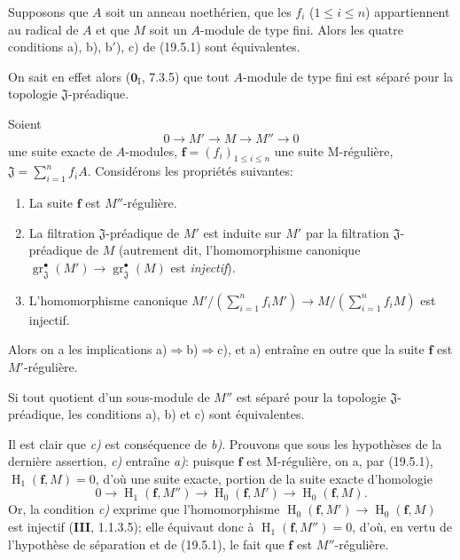 \begin{corollary}[19.5.2]
\label{IV.19.5.2}
Supposons que $A$ soit un anneau noethérien, que les $f_i$ \textup{($1\leq i\leq n$)} appartiennent au radical de $A$ et que $M$ soit un $A$-module de type fini. Alors les quatre conditions \textup{a), b), b$'$), c)} de \textup{(19.5.1)} sont équivalentes.
\end{corollary}

On sait en effet alors ($\mathbf{0}_{\mathrm I}$, 7.3.5) que tout $A$-module de type fini est séparé pour la topologie $\mathfrak J$-préadique.

\begin{proposition}[19.5.3]
\label{IV.19.5.3}
Soient
\[
  0\longrightarrow M'\longrightarrow M\longrightarrow M''\longrightarrow0
\]
une suite exacte de $A$-modules, $\mathbf f=(f_i)_{1\leq i\leq n}$ une suite M-régulière, $\mathfrak J=\sum_{i=1}^n f_iA$. Considérons les propriétés suivantes:
\begin{enumerate}
  \item[\textup{a)}] La suite $\mathbf f$ est $M''$-régulière.
  \item[\textup{b)}] La filtration $\mathfrak J$-préadique de $M'$ est induite sur $M'$ par la filtration $\mathfrak J$-préadique de $M$ \textup{(autrement dit, l'homomorphisme canonique $\operatorname{gr}_{\mathfrak J}^\bullet(M')\to\operatorname{gr}_{\mathfrak J}^\bullet(M)$ est \emph{injectif})}.
  \item[\textup{c)}] L'homomorphisme canonique $M'/(\sum_{i=1}^n f_iM')\to M/(\sum_{i=1}^n f_iM)$ est injectif.
\end{enumerate}

Alors on a les implications \textup{a)}$\Rightarrow$\textup{b)}$\Rightarrow$\textup{c)}, et \textup{a)} entraîne en outre que la suite $\mathbf f$ est $M'$-régulière.

Si tout quotient d'un sous-module de $M''$ est séparé pour la topologie $\mathfrak J$-préadique, les conditions \textup{a)}, \textup{b)} et \textup{c)} sont équivalentes.
\end{proposition}

Il est clair que \emph{c)} est conséquence de \emph{b)}. Prouvons que sous les hypothèses de la dernière assertion, \emph{c)} entraîne \emph{a)}: puisque $\mathbf f$ est M-régulière, on a, par (19.5.1), $\operatorname{H}_1(\mathbf f,M)=0$, d'où une suite exacte, portion de la suite exacte d'homologie
\[
  0\longrightarrow\operatorname{H}_1(\mathbf f,M'')\longrightarrow\operatorname{H}_0(\mathbf f,M')\longrightarrow\operatorname{H}_0(\mathbf f,M).
\]
Or, la condition \emph{c)} exprime que l'homomorphisme $\operatorname{H}_0(\mathbf f,M')\to\operatorname{H}_0(\mathbf f,M)$ est injectif (\textbf{III}, 1.1.3.5); elle équivaut donc à $\operatorname{H}_1(\mathbf f,M'')=0$, d'où, en vertu de l'hypothèse de séparation et de (19.5.1), le fait que $\mathbf f$ est $M''$-régulière.

